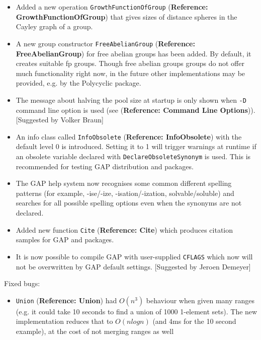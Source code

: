 \documentclass[a4paper,11pt]{report}
\begin{document}
{{{\begin{itemize}
 If a semigroup is created by generators in the category
IsMultiplicativeElementWithOneCollection and CanEasilyCompareElements, then it
is now checked if the One of the generators is given as a generator. In this
case, the semigroup is created as a monoid. 
\item  Added a new operation \texttt{GrowthFunctionOfGroup} (\textbf{Reference: GrowthFunctionOfGroup}) that gives sizes of distance spheres in the Cayley graph of a group. 
\item   A new group constructor \texttt{FreeAbelianGroup} (\textbf{Reference: FreeAbelianGroup}) for free abelian groups has been added. By default, it creates suitable fp
groups. Though free abelian groups groups do not offer much functionality
right now, in the future other implementations may be provided, e.g. by the \textsf{Polycyclic} package. 
\item   The message about halving the pool size at startup is only shown when \texttt{-D} command line option is used (see  (\textbf{Reference: Command Line Options})). [Suggested by Volker Braun] 
\item   An info class called \texttt{InfoObsolete} (\textbf{Reference: InfoObsolete}) with the default level 0 is introduced. Setting it to 1 will trigger warnings
at runtime if an obsolete variable declared with \texttt{DeclareObsoleteSynonym} is used. This is recommended for testing \textsf{GAP} distribution and packages. 
\item  The \textsf{GAP} help system now recognises some common different spelling patterns (for
example, -ise/-ize, -isation/-ization, solvable/soluble) and searches for all
possible spelling options even when the synonyms are not declared. 
\item   Added new function \texttt{Cite} (\textbf{Reference: Cite}) which produces citation samples for \textsf{GAP} and packages. 
\item   It is now possible to compile \textsf{GAP} with user-supplied \texttt{CFLAGS} which now will not be overwritten by \textsf{GAP} default settings. [Suggested by Jeroen Demeyer] 
\end{itemize}
 Fixed bugs: 
\begin{itemize}
\item   \texttt{Union} (\textbf{Reference: Union}) had $O(n^3)$ behaviour when given many ranges (e.g. it could take 10 seconds to find a
union of 1000 1-element sets). The new implementation reduces that to $O(n log n)$ (and 4ms for the 10 second example), at the cost of not merging ranges as well

\end{itemize}}}}
\end{document}
